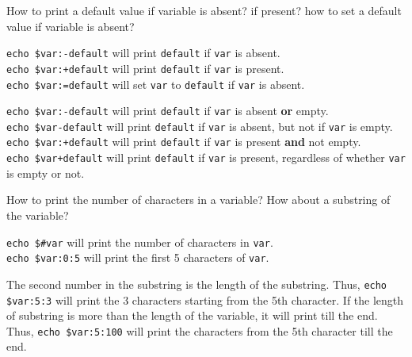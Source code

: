 \begin{qs}
  How to print a default value if variable is absent? if present? how to
  set a default value if variable is absent?
\end{qs}

\begin{ans}
  \texttt{echo \${var:-default}} will print \texttt{default} if \texttt{var} is absent. \\
  \texttt{echo \${var:+default}} will print \texttt{default} if \texttt{var} is present. \\
  \texttt{echo \${var:=default}} will set \texttt{var} to \texttt{default} if \texttt{var} is absent. \\
\end{ans}

\begin{remark}
  \texttt{echo \${var:-default}} will print \texttt{default} if \texttt{var} is absent \textbf{or} empty. \\
  \texttt{echo \${var-default}} will print \texttt{default} if \texttt{var} is absent, but not if \texttt{var} is empty. \\
  \texttt{echo \${var:+default}} will print \texttt{default} if \texttt{var} is present \textbf{and} not empty. \\
  \texttt{echo \${var+default}} will print \texttt{default} if \texttt{var} is present,
  regardless of whether \texttt{var} is empty or not. \\
\end{remark}


\begin{qs}
  How to print the number of characters in a variable?
  How about a substring of the variable?
\end{qs}

\begin{ans}
  \texttt{echo \${\#var}} will print the number of characters in \texttt{var}. \\
  \texttt{echo \${var:0:5}} will print the first 5 characters of \texttt{var}.
\end{ans}

\begin{remark}
  The second number in the substring is the length of the substring.
  Thus, \texttt{echo \${var:5:3}} will print the 3 characters starting from the 5th character.
  If the length of substring is more than the length of the variable, it will print till the end.
  Thus, \texttt{echo \${var:5:100}} will print the characters from the 5th character till the end.
\end{remark}


